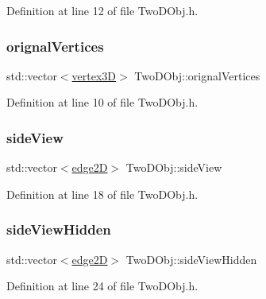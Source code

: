 Definition at line 12 of file Two\+D\+Obj.\+h.

\mbox{\label{class_two_d_obj_a5ed2cf65947c6c8f40de03d7ecba9f4b}} 
\subsubsection{\texorpdfstring{orignal\+Vertices}{orignalVertices}}
{\footnotesize\ttfamily std\+::vector$<$\mbox{\hyperlink{structvertex3_d}{vertex3D}}$>$ Two\+D\+Obj\+::orignal\+Vertices}



Definition at line 10 of file Two\+D\+Obj.\+h.

\mbox{\label{class_two_d_obj_a192176306bc5f2115e3d546f218356bb}} 
\subsubsection{\texorpdfstring{side\+View}{sideView}}
{\footnotesize\ttfamily std\+::vector$<$\mbox{\hyperlink{structedge2_d}{edge2D}}$>$ Two\+D\+Obj\+::side\+View}



Definition at line 18 of file Two\+D\+Obj.\+h.

\mbox{\label{class_two_d_obj_a7ac59f63f8dddd766ede7537e4f56b6a}} 
\subsubsection{\texorpdfstring{side\+View\+Hidden}{sideViewHidden}}
{\footnotesize\ttfamily std\+::vector$<$\mbox{\hyperlink{structedge2_d}{edge2D}}$>$ Two\+D\+Obj\+::side\+View\+Hidden}



Definition at line 24 of file Two\+D\+Obj.\+h.

\mbox{\label{class_two_d_obj_a813fa6689e1481cb6a0b851d925785bd}} 
